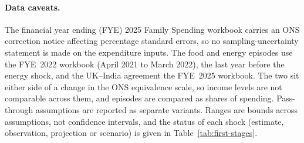\paragraph{Data caveats.} The financial year ending (FYE) 2025 Family Spending workbook carries
an ONS correction notice affecting percentage standard errors, so no
sampling-uncertainty statement is made on the expenditure inputs. The
food and energy episodes use the FYE~2022 workbook (April 2021 to March
2022), the last year before the energy shock, and the UK--India
agreement the FYE~2025 workbook. The two sit either side of a change in
the ONS equivalence scale, so income levels are not comparable across
them, and episodes are compared as shares of spending. Pass-through
assumptions are reported as separate variants. Ranges are bounds
across assumptions, not confidence intervals, and the status of each
shock (estimate, observation, projection or scenario) is given in
Table~\ref{tab:first-stages}.
